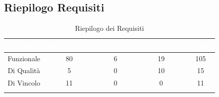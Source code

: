 \subsection{Riepilogo Requisiti}\label{Riepilogo}
\begin{center}
\begin{longtable}[c]{|c|c|c|c|c|}
\hline
\rowcolor{bluelogo}\textbf{\textcolor{white}{Tipologia}} & \textbf{\textcolor{white}{Obbligatorio}} & \textbf{\textcolor{white}{Opzionale}} & \textbf{\textcolor{white}{Desiderabile}} & \textbf{\textcolor{white}{Totale}}\\
\hline \hline
\endhead
Funzionale & 80 & 6 & 19 & 105\\
\hline
\rowcolor{grigio}Di Qualità & 5 & 0 & 10 & 15\\
\hline
Di Vincolo & 11 & 0 & 0 & 11\\
\hline
\caption{Riepilogo dei Requisiti}
\end{longtable}
\end{center}
